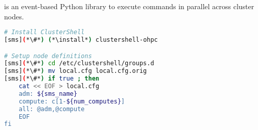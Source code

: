 \clustershell{} is an event-based Python library to execute commands in parallel
across cluster nodes. 

\begin{lstlisting}[language=bash,keywords={},upquote=true]
# Install ClusterShell
[sms](*\#*) (*\install*) clustershell-ohpc

# Setup node definitions
[sms](*\#*) cd /etc/clustershell/groups.d
[sms](*\#*) mv local.cfg local.cfg.orig
[sms](*\#*) if true ; then
    cat << EOF > local.cfg
    adm: ${sms_name}
    compute: c[1-${num_computes}]
    all: @adm,@compute
    EOF
fi
\end{lstlisting}

